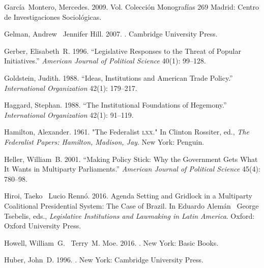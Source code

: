 \documentclass[letter,12pt]{article}
\begin{document}
\begin{thebibliography}{xx}
Garc\'ia~Montero, Mercedes. 2009.
\newblock Vol. Colecci\'on Monograf\'ias 269 Madrid:  Centro de Investigaciones
  Sociol\'ogicas.

Gelman, Andrew \harvardand\ Jennifer Hill. 2007.
.
\newblock Cambridge University Press.

Gerber, Elisabeth~R. 1996.
\newblock ``Legislative Responses to the Threat of Popular Initiatives.'' {\em
  American Journal of Political Science} 40(1): 99--128.

Goldstein, Judith. 1988.
\newblock ``Ideas, Institutions and American Trade Policy.'' {\em International
  Organization} 42(1): 179--217.

Haggard, Stephan. 1988.
\newblock ``The Institutional Foundations of Hegemony.'' {\em International
  Organization} 42(1): 91--119.

Hamilton, Alexander. 1961.
\newblock "The Federalist \textsc{lxx}." In Clinton Rossiter, ed., {\em The Federalist Papers: Hamilton, Madison, Jay}.
\newblock New York:  Penguin.

Heller, William~B. 2001.
\newblock ``Making Policy Stick: Why the Government Gets What It Wants in
  Multiparty Parliaments.'' {\em American Journal of Political Science}
  45(4): 780--98.

Hiroi, Taeko \harvardand\ Lucio Renn\'o. 2016.
\newblock Agenda Setting and Gridlock in a Multiparty Coalitional Presidential
  System: The Case of Brazil.  In Eduardo Alem\'an \harvardand\ George Tsebelis, eds., {\em Legislative Institutions and Lawmaking
  in Latin America}. 
\newblock Oxford:  Oxford University Press.

Howell, William~G. \harvardand\ Terry~M. Moe. 2016.
.
\newblock New York:  Basic Books.

Huber, John~D. 1996.
.
\newblock New York:  Cambridge University Press.


\end{thebibliography}
\end{document}
